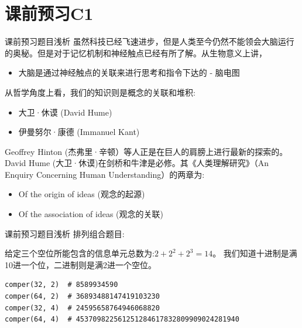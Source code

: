 \documentclass[handout]{beamer}
\begin{document}
\section{课前预习C1}

\begin{frame}{课前预习题目浅析}
	虽然科技已经飞速进步，但是人类至今仍然不能领会大脑运行的奥秘。但是对于记忆机制和神经触点已经有所了解。从生物意义上讲，
	\begin{itemize}
		\item 大脑是通过神经触点的关联来进行思考和指令下达的 - 脑电图
	\end{itemize}
	
	\hfil 
	
	从哲学角度上看，我们的知识则是概念的关联和堆积:
	\begin{itemize}
		\item 大卫·休谟 (David Hume)
		\item 伊曼努尔·康德 (Immanuel Kant) 
	\end{itemize}
	
	\hfil 
	
	Geoffrey Hinton (杰弗里·辛顿）等人正是在巨人的肩膀上进行最新的探索的。David Hume (大卫·休谟)在剑桥和牛津是必修。其《人类理解研究》（An Enquiry Concerning Human Understanding）的两章为:
	\begin{itemize}
		\item Of the origin of ideas (观念的起源)
		\item Of the association of ideas (观念的关联)
	\end{itemize}
\end{frame}

\begin{frame}[fragile]{课前预习题目浅析}
排列组合题目: 
\begin{figure}[H]
		\centering
	\end{figure}	
	给定三个空位所能包含的信息单元总数为:$2+2^2+2^3 = 14$。 我们知道十进制是满10进一个位，二进制则是满2进一个空位。
	\begin{lstlisting}
comper(32, 2)  # 8589934590
comper(64, 2)  # 36893488147419103230
comper(32, 4)  # 24595658764946068820
comper(64, 4)  # 453709822561251284617832809909024281940
\end{lstlisting}
\end{frame}
\end{document}
